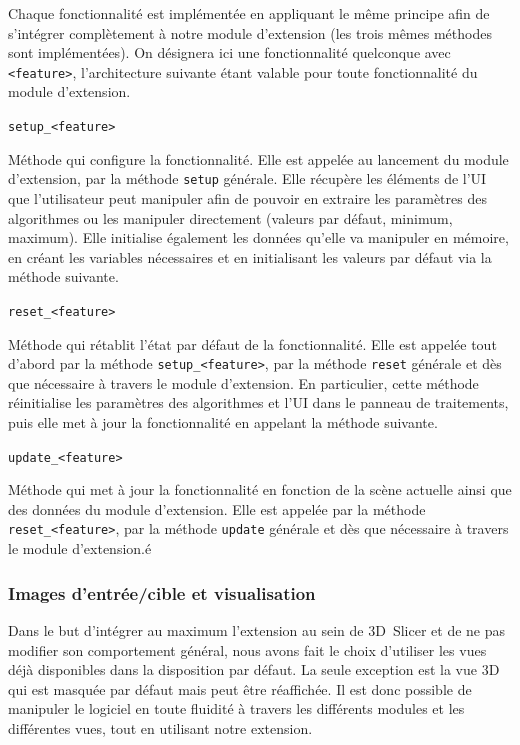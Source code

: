\documentclass{article}
\newcommand{\method}[1]{\hspace{1in}\texttt{#1}\bigskip}
\begin{document}
{{{            Chaque fonctionnalité est implémentée en appliquant le même principe afin de s'intégrer complètement à notre module d'extension (les trois mêmes méthodes sont implémentées). On désignera ici une fonctionnalité quelconque avec \texttt{<feature>}, l'architecture suivante étant valable pour toute fonctionnalité du module d'extension.

            \bigskip
            \method{setup\_<feature>}

            Méthode qui configure la fonctionnalité. Elle est appelée au lancement du module d'extension, par la méthode \texttt{setup} générale. Elle récupère les éléments de l'UI que l'utilisateur peut manipuler afin de pouvoir en extraire les paramètres des algorithmes ou les manipuler directement (valeurs par défaut, minimum, maximum). Elle initialise également les données qu'elle va manipuler en mémoire, en créant les variables nécessaires et en initialisant les valeurs par défaut via la méthode suivante.

            \bigskip
            \method{reset\_<feature>}

            Méthode qui rétablit l'état par défaut de la fonctionnalité. Elle est appelée tout d'abord par la méthode \texttt{setup\_<feature>}, par la méthode \texttt{reset} générale et dès que nécessaire à travers le module d'extension. En particulier, cette méthode réinitialise les paramètres des algorithmes et l'UI dans le panneau de traitements, puis elle met à jour la fonctionnalité en appelant la méthode suivante.

            \bigskip
            \method{update\_<feature>}

            Méthode qui met à jour la fonctionnalité en fonction de la scène actuelle ainsi que des données du module d'extension. Elle est appelée par la méthode \texttt{reset\_<feature>}, par la méthode \texttt{update} générale et dès que nécessaire à travers le module d'extension.é
        }

        {
            \subsubsection{Images d'entrée/cible et visualisation}
            \label{subsubsec:input-target-visualization}

            Dans le but d'intégrer au maximum l'extension au sein de 3D~Slicer et de ne pas modifier son comportement général, nous avons fait le choix d'utiliser les vues déjà disponibles dans la disposition par défaut. La seule exception est la vue 3D qui est masquée par défaut mais peut être réaffichée. Il est donc possible de manipuler le logiciel en toute fluidité à travers les différents modules et les différentes vues, tout en utilisant notre extension.

}}}
\end{document}

